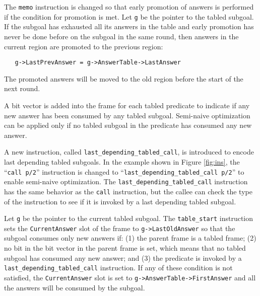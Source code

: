 \documentclass{tlp}
\begin{document}
The {\tt memo} instruction is changed so that early promotion of answers is performed if the condition for promotion is met. Let {\tt g} be the pointer to the tabled subgoal. If the subgoal has exhausted all its answers in the table and early promotion has never be done before on the subgoal in the same round, then answers in the current region are promoted to the previous region:
\begin{verbatim}
   g->LastPrevAnswer = g->AnswerTable->LastAnswer
\end{verbatim}
The promoted answers will be moved to the old region before the start of the next round.

A bit vector is added into the frame for each tabled predicate to indicate if any new answer has been consumed by any tabled subgoal. Semi-naive optimization can be applied only if no tabled subgoal in the predicate has consumed any new answer.

A new instruction, called {\tt last\_depending\_tabled\_call}, is introduced to encode last depending tabled subgoals.  In the example shown in Figure \ref{fig:ins}, the ``{\tt call p/2}'' instruction is changed to ``{\tt last\_depending\_tabled\_call p/2}'' to enable semi-naive optimization. The {\tt last\_depending\_tabled\_call} instruction has the same behavior as the {\tt call} instruction, but the callee can check the type of the instruction to see if it is invoked by a last depending tabled subgoal.

Let {\tt g} be the pointer to the current tabled subgoal. The {\tt table\_start} instruction sets the {\tt CurrentAnswer} slot of the frame to \verb+g->LastOldAnswer+ so that the subgoal consumes only new answers if: (1) the parent frame is a tabled frame; (2) no bit in the bit vector in the parent frame is set, which means that no tabled subgoal has consumed any new answer; and (3) the predicate is invoked by a {\tt last\_depending\_tabled\_call} instruction. If any of these condition is not satisfied, the {\tt CurrentAnswer} slot is set to \verb+g->AnswerTable->FirstAnswer+ and all the answers will be consumed by the subgoal.
\end{document}
